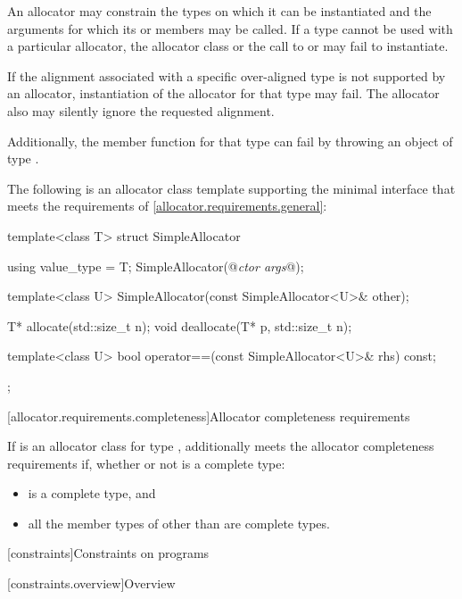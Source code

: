 \pnum
An allocator may constrain the types on which it can be instantiated and the
arguments for which its  or  members may be
called. If a type cannot be used with a particular allocator, the allocator
class or the call to  or  may fail to instantiate.

\pnum
If the alignment associated with a specific over-aligned type is not
supported by an allocator, instantiation of the allocator for that type may
fail. The allocator also may silently ignore the requested alignment.
\begin{note}
Additionally, the member function 
for that type can fail by throwing an object of type
.
\end{note}

\pnum
\begin{example}
The following is an allocator class template supporting the minimal
interface that meets the requirements of \ref{allocator.requirements.general}:

\begin{codeblock}
template<class T>
struct SimpleAllocator {
  using value_type = T;
  SimpleAllocator(@\textit{ctor args}@);

  template<class U> SimpleAllocator(const SimpleAllocator<U>& other);

  T* allocate(std::size_t n);
  void deallocate(T* p, std::size_t n);

  template<class U> bool operator==(const SimpleAllocator<U>& rhs) const;
};
\end{codeblock}
\end{example}

[allocator.requirements.completeness]{Allocator completeness requirements}

\pnum
If  is an allocator class for type ,
 additionally meets the allocator completeness requirements if,
whether or not  is a complete type:
\begin{itemize}
\item {} is a complete type, and
\item all the member types of 
  other than  are complete types.
\end{itemize}

[constraints]{Constraints on programs}

[constraints.overview]{Overview}

